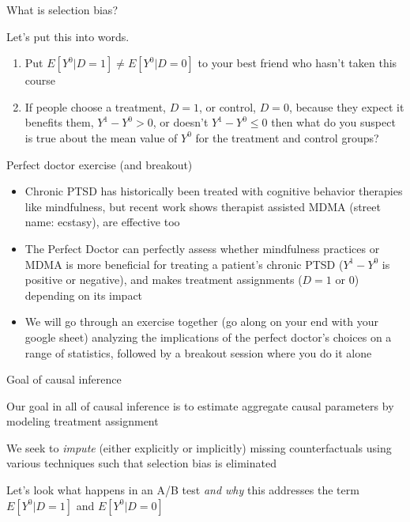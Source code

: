 \documentclass{beamer}
\begin{document}
\begin{frame}{What is selection bias?}

  Let's put this into words.
  \bigskip
  \begin{enumerate}
    \item Put $E[Y^0|D=1] \neq E[Y^0|D=0]$ to your best friend who hasn't taken this course
    \item If people choose a treatment, $D=1$, or control, $D=0$, because they expect it benefits them, $Y^1-Y^0>0$, or doesn't $Y^1-Y^0\leq0$ then what do you suspect is true about the mean value of $Y^0$ for the treatment and control groups?
  \end{enumerate}

\end{frame}


\begin{frame}{Perfect doctor exercise (and breakout)}

  \begin{itemize}
    \item Chronic PTSD has historically been treated with cognitive behavior therapies like mindfulness, but recent work shows therapist assisted MDMA (street name: ecstasy), are effective too
    \item The Perfect Doctor can perfectly assess whether mindfulness practices or MDMA is more beneficial for treating a patient's chronic PTSD ($Y^1 - Y^0$ is positive or negative), and makes treatment assignments ($D=1$ or $0$) depending on its impact
    \item We will go through an exercise together (go along on your end with your google sheet) analyzing the implications of the perfect doctor's choices on a range of statistics, followed by a breakout session where you do it alone
  \end{itemize}
\end{frame}


\begin{frame}{Goal of causal inference}

  Our goal in all of causal inference is to estimate aggregate causal parameters by modeling treatment assignment

  \bigskip

  We seek to \emph{impute} (either explicitly or implicitly) missing counterfactuals using various techniques such that selection bias is eliminated

  \bigskip

  Let's look what happens in an A/B test \emph{and why} this addresses the term $E[Y^0|D=1]$ and $E[Y^0|D=0]$

\end{frame}
\end{document}
